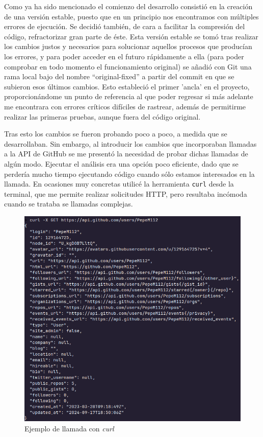 \documentclass[a4paper, 12pt]{book}
\begin{document}
Como ya ha sido mencionado el comienzo del desarrollo consistió en la creación de una versión estable, puesto que en un principio nos encontramos con múltiples errores de ejecución. Se decidió también, de cara a facilitar la compresión del código, refractorizar gran parte de éste. Esta versión estable se tomó tras realizar los cambios justos y necesarios para solucionar aquellos procesos que producían los errores, y para poder acceder en el futuro rápidamente a ella (para poder comprobar en todo momento el funcionamiento original) se añadió con Git una rama local bajo del nombre ``original-fixed'' a partir del commit en que se subieron esos últimos cambios. Esto estableció el primer 'ancla' en el proyecto, proporcionándome un punto de referencia al que poder regresar si más adelante me encontrara con errores críticos difíciles de rastrear, además de permitirme realizar las primeras pruebas, aunque fuera del código original.

Tras esto los cambios se fueron probando poco a poco, a medida que se desarrollaban. Sin embargo, al introducir los cambios que incorporaban llamadas a la API de GitHub se me presentó la necesidad de probar dichas llamadas de algún modo. Ejecutar el análisis era una opción poco eficiente, dado que se perdería mucho tiempo ejecutando código cuando sólo estamos interesados en la llamada. En ocasiones muy concretas utilicé la herramienta \texttt{curl} desde la terminal, que me permite realizar solicitudes HTTP, pero resultaba incómoda cuando se trataba se llamadas complejas.

\vspace{1em}
\begin{figure}[H]
    \centering
    \includegraphics[width=15cm]{img/curl_example.png}
    \caption{Ejemplo de llamada con \textit{curl}}
    \label{fig:postman}
\end{figure}
\end{document}
